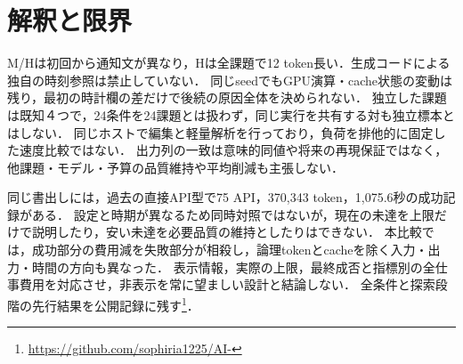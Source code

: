 \documentclass[uplatex,a4paper,twocolumn,10pt]{jsarticle}
\begin{document}
\section{解釈と限界}
M/Hは初回から通知文が異なり，Hは全課題で12 token長い．生成コードによる独自の時刻参照は禁止していない．
同じseedでもGPU演算・cache状態の変動は残り，最初の時計欄の差だけで後続の原因全体を決められない．
独立した課題は既知４つで，24条件を24課題とは扱わず，同じ実行を共有する対も独立標本とはしない．
同じホストで編集と軽量解析を行っており，負荷を排他的に固定した速度比較ではない．
出力列の一致は意味的同値や将来の再現保証ではなく，他課題・モデル・予算の品質維持や平均削減も主張しない．

同じ書出しには，過去の直接API型で75 API，370,343 token，1,075.6秒の成功記録がある．
設定と時期が異なるため同時対照ではないが，現在の未達を上限だけで説明したり，安い未達を必要品質の維持としたりはできない．
本比較では，成功部分の費用減を失敗部分が相殺し，論理tokenとcacheを除く入力・出力・時間の方向も異なった．
表示情報，実際の上限，最終成否と指標別の全仕事費用を対応させ，非表示を常に望ましい設計と結論しない．
全条件と探索段階の先行結果を公開記録に残す\footnote{\url{https://github.com/sophiria1225/AI-}}．
\end{document}
